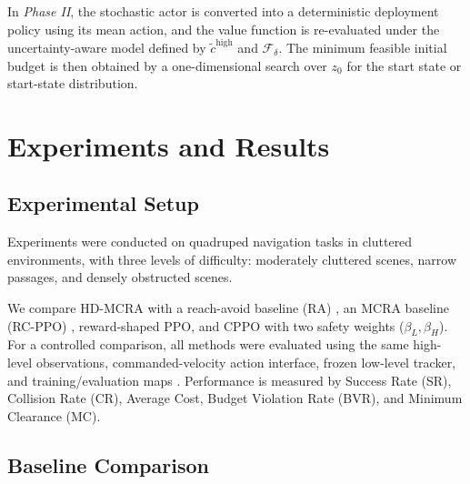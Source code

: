 \documentclass[conference]{IEEEtran}
\begin{document}
In \emph{Phase II}, the stochastic actor is converted into a deterministic deployment policy using its mean action, and the value function is re-evaluated under the uncertainty-aware model defined by $\tilde{c}^{\mathrm{high}}$ and $\mathcal{F}_{\delta}$. The minimum feasible initial budget is then obtained by a one-dimensional search over $z_0$ for the start state or start-state distribution.




























\section{Experiments and Results}

\subsection{Experimental Setup}

Experiments were conducted on quadruped navigation tasks in cluttered environments, with three levels of difficulty: moderately cluttered scenes, narrow passages, and densely obstructed scenes.

We compare HD-MCRA with a reach-avoid baseline (RA) \cite{DBLP:conf/rss/HsuRTF21}, an MCRA baseline (RC-PPO) \cite{DBLP:conf/nips/SoGF24}, reward-shaped PPO, and CPPO with two safety weights ($\beta_L,\beta_H$). For a controlled comparison, all methods were evaluated using the same high-level observations, commanded-velocity action interface, frozen low-level tracker, and training/evaluation maps \cite{DBLP:conf/icml/AchiamHTA17,DBLP:conf/iclr/TesslerMM19,GuerrierFB24,MikiLWH24,DBLP:conf/icra/WeerakoonSEM24}. Performance is measured by Success Rate (SR), Collision Rate (CR), Average Cost, Budget Violation Rate (BVR), and Minimum Clearance (MC).

\subsection{Baseline Comparison}
\end{document}
